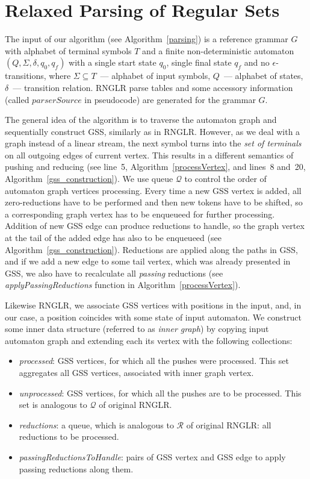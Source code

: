 \section{Relaxed Parsing of Regular Sets}

The input of our algorithm (see Algorithm~\ref{parsing}) is a reference grammar $G$ with alphabet of terminal symbols $T$ 
and a finite non-deterministic automaton $(Q, \Sigma, \delta, q_0, q_f)$ with a single start state $q_0$, single final state $q_f$ 
and no $\epsilon$-transitions, where $\Sigma \subseteq T$~--- alphabet of input symbols, $Q$~--- alphabet of states, 
$\delta$~--- transition relation. RNGLR parse tables and some accessory information (called $parserSource$ in pseudocode) 
are generated for the grammar $G$. 

The general idea of the algorithm is to traverse the automaton graph and sequentially construct GSS, similarly as in RNGLR.
However, as we deal with a graph instead of a linear stream, the next symbol turns into the \emph{set of terminals} on 
all outgoing edges of current vertex. This results in a different semantics of pushing and reducing (see line~5, 
Algorithm~\ref{processVertex}, and lines~8 and~20, Algorithm~\ref{gss_construction}). We use queue $\mathcal Q$ to control the 
order of automaton graph vertices processing. Every time a new GSS vertex is added, all zero-reductions have to be performed 
and then new tokens have to be shifted, so a corresponding graph vertex has to be enqueueed for further processing. 
Addition of new GSS edge can produce reductions to handle, so the graph vertex at the tail of the added edge has 
also to be enqueueed (see Algorithm~\ref{gss_construction}). Reductions are applied along the paths in GSS, and if we add
a new edge to some tail vertex, which was already presented in GSS, we also have to recalculate all \emph{passing} reductions
(see \emph{applyPassingReductions} function in Algorithm~\ref{processVertex}).

Likewise RNGLR, we associate GSS vertices with positions in the input,
and, in our case, a position coincides with some state of input automaton. We construct some
inner data structure (referred to as \emph{inner graph}) by copying input automaton graph and 
extending each its vertex with the following collections: 

\begin{itemize}
  \item \emph{processed}: GSS vertices, for which all the pushes were processed. 
   This set aggregates all GSS vertices, associated with inner graph vertex.
  \item \emph{unprocessed}: GSS vertices, for which all the pushes are to be processed. 
   This set is analogous to $\mathcal{Q}$ of original RNGLR.
  \item \emph{reductions}: a queue, which is analogous to $\mathcal{R}$ of original RNGLR: 
   all reductions to be processed.
  \item \emph{passingReductionsToHandle}: pairs of GSS vertex and GSS edge to apply 
   passing reductions along them.
\end{itemize}

